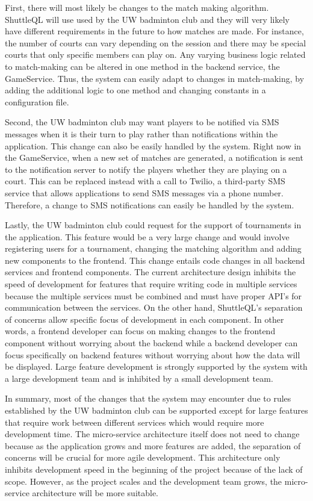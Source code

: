 \documentclass{article}
\begin{document}
First, there will most likely be changes to the match making algorithm. ShuttleQL will use used by the UW badminton club and they will very likely have different requirements in the future to how matches are made. For instance, the number of courts can vary depending on the session and there may be special courts that only specific members can play on. Any varying business logic related to match-making can be altered in one method in the backend service, the GameService. Thus, the system can easily adapt to changes in match-making, by adding the additional logic to one method and changing constants in a configuration file.

Second, the UW badminton club may want players to be notified via SMS messages when it is their turn to play rather than notifications within the application. This change can also be easily handled by the system. Right now in the GameService, when a new set of matches are generated, a notification is sent to the notification server to notify the players whether they are playing on a court. This can be replaced instead with a call to Twilio, a third-party SMS service that allows applications to send SMS messages via a phone number. Therefore, a change to SMS notifications can easily be handled by the system.

Lastly, the UW badminton club could request for the support of tournaments in the application. This feature would be a very large change and would involve registering users for a tournament, changing the matching algorithm and adding new components to the frontend. This change entails code changes in all backend services and frontend components. The current architecture design inhibits the speed of development for features that require writing code in multiple services because the multiple services must be combined and must have proper API’s for communication between the services. On the other hand, ShuttleQL’s separation of concerns allow specific focus of development in each component. In other words, a frontend developer can focus on making changes to the frontend component without worrying about the backend while a backend developer can focus specifically on backend features without worrying about how the data will be displayed. Large feature development is strongly supported by the system with a large development team and is inhibited by a small development team.

In summary, most of the changes that the system may encounter due to rules established by the UW badminton club can be supported except for large features that require work between different services which would require more development time. The micro-service architecture itself does not need to change because as the application grows and more features are added, the separation of concerns will be crucial for more agile development. This architecture only inhibits development speed in the beginning of the project because of the lack of scope. However, as the project scales and the development team grows, the micro-service architecture will be more suitable.
\end{document}
